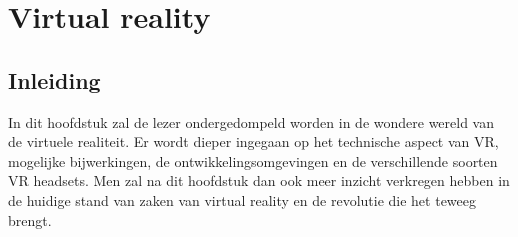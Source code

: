 \chapter{Virtual reality}
\label{ch:stand-van-zaken}




%


\section{Inleiding}
In dit hoofdstuk zal de lezer ondergedompeld worden in de wondere wereld van de virtuele realiteit. Er wordt dieper ingegaan op het technische aspect van VR, mogelijke bijwerkingen, de ontwikkelingsomgevingen en de verschillende soorten VR headsets. Men zal na dit hoofdstuk dan ook meer inzicht verkregen hebben in de huidige stand van zaken van virtual reality en de revolutie die het teweeg brengt.

